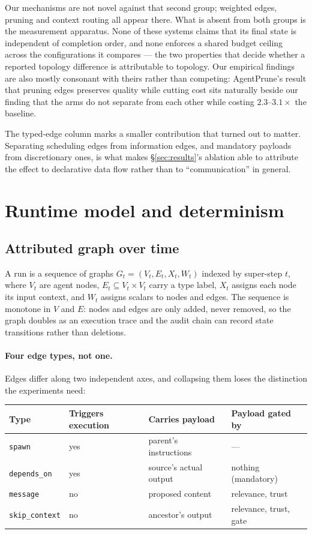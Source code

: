 \documentclass[10pt]{article}
\begin{document}
Our mechanisms are not novel against that second group; weighted edges, pruning
and context routing all appear there. What is absent from both groups is the
measurement apparatus. None of these systems claims that its final state is
independent of completion order, and none enforces a shared budget ceiling
across the configurations it compares --- the two properties that decide whether
a reported topology difference is attributable to topology. Our empirical
findings are also mostly consonant with theirs rather than competing:
AgentPrune's result that pruning edges preserves quality while cutting cost sits
naturally beside our finding that the arms do not separate from each other while
costing $2.3$--$3.1\times$ the baseline.

The typed-edge column marks a smaller contribution that turned out to matter.
Separating scheduling edges from information edges, and mandatory payloads from
discretionary ones, is what makes §\ref{sec:results}'s ablation able to
attribute the effect to declarative data flow rather than to ``communication''
in general.

\section{Runtime model and determinism}
\label{sec:runtime}

\subsection{Attributed graph over time}

A run is a sequence of graphs $G_t = (V_t, E_t, X_t, W_t)$ indexed by super-step
$t$, where $V_t$ are agent nodes, $E_t \subseteq V_t \times V_t$ carry a type
label, $X_t$ assigns each node its input context, and $W_t$ assigns scalars to
nodes and edges. The sequence is monotone in $V$ and $E$: nodes and edges are
only added, never removed, so the graph doubles as an execution trace and the
audit chain can record state transitions rather than deletions.

\paragraph{Four edge types, not one.}
Edges differ along two independent axes, and collapsing them loses the
distinction the experiments need:

\begin{center}
\begin{tabular}{llll}
\toprule
Type & Triggers execution & Carries payload & Payload gated by \\
\midrule
\texttt{spawn}        & yes & parent's instructions   & --- \\
\texttt{depends\_on}  & yes & source's actual output  & nothing (mandatory) \\
\texttt{message}      & no  & proposed content        & relevance, trust \\
\texttt{skip\_context}& no  & ancestor's output       & relevance, trust, gate \\
\bottomrule
\end{tabular}
\end{center}
\end{document}
